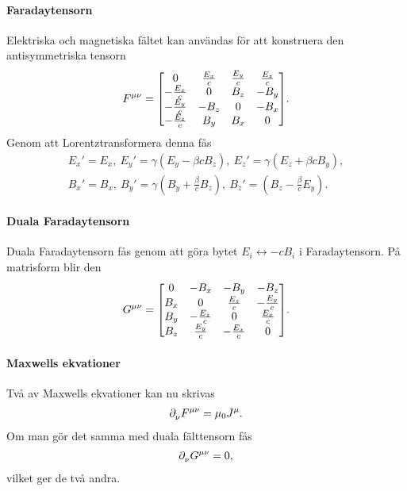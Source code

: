 \paragraph{Faradaytensorn}
Elektriska och magnetiska fältet kan användas för att konstruera den antisymmetriska tensorn
\begin{align*}
	F^{\mu\nu} = 
	\mqty
	[
		0                & \frac{E_{x}}{c} & \frac{E_{y}}{c} & \frac{E_{z}}{c} \\
		-\frac{E_{x}}{c} & 0               & B_{z}           & -B_{y} \\
		-\frac{E_{y}}{c} & -B_{z}          & 0               & -B_{x}  \\
		-\frac{E_{z}}{c} & B_{y}           & B_{x}           & 0
	].
\end{align*}
Genom att Lorentztransformera denna fås
\begin{align*}
	E_{x}' = E_{x},\ E_{y}' = \gamma(E_{y} - \beta cB_{z}),\ E_{z}' = \gamma(E_{z} + \beta cB_{y}), \\
	B_{x}' = B_{x},\ B_{y}' = \gamma\left(B_{y} + \frac{\beta}{c}B_{z}\right),\ B_{z}' = \left(B_{z} - \frac{\beta}{c}E_{y}\right).
\end{align*}

\paragraph{Duala Faradaytensorn}
Duala Faradaytensorn fås genom att göra bytet $E_{i}\leftrightarrow -cB_{i}$ i Faradaytensorn. På matrisform blir den
\begin{align*}
	G^{\mu\nu} = 
	\mqty
	[
		0     & -B_{x}           & -B_{y}           & -B_{z} \\
		B_{x} & 0                & \frac{E_{z}}{c}  & -\frac{E_{y}}{c} \\
		B_{y} & -\frac{E_{z}}{c} & 0                & \frac{E_{x}}{c}  \\
		B_{z} & \frac{E_{y}}{c}  & -\frac{E_{x}}{c} & 0
	].
\end{align*}

\paragraph{Maxwells ekvationer}
Två av Maxwells ekvationer kan nu skrivas
\begin{align*}
	\partial_{\nu}^{}F^{\mu\nu} = \mu_{0}J^{\mu}.
\end{align*}
Om man gör det samma med duala fälttensorn fås
\begin{align*}
	\partial_{\nu}^{}G^{\mu\nu} = 0,
\end{align*}
vilket ger de två andra.